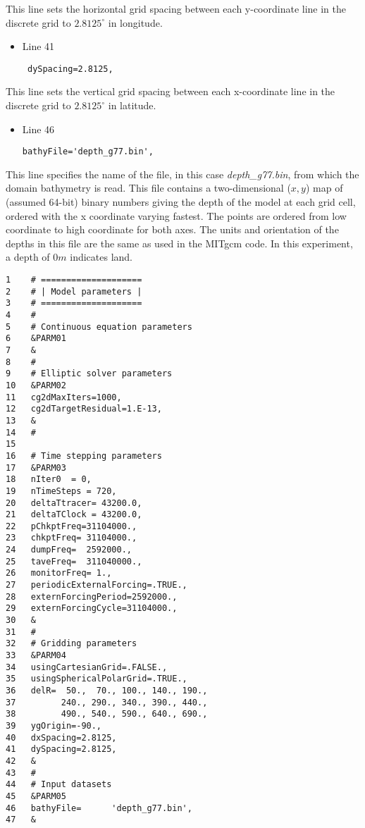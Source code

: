 \noindent This line sets the horizontal grid spacing between each
y-coordinate line in the discrete grid to $2.8125^{\circ}$ in
longitude.

\begin{itemize}
\item Line 41
\begin {verbatim}
 dySpacing=2.8125,
\end{verbatim}
\end{itemize}

\noindent This line sets the vertical grid spacing between each
x-coordinate line in the discrete grid to $2.8125^{\circ}$ in
latitude.

\begin{itemize}
\item Line 46
\begin {verbatim}
bathyFile='depth_g77.bin',
\end{verbatim}
\end{itemize}

\noindent This line specifies the name of the file, in this case {\it
  depth\_g77.bin}, from which the domain bathymetry is read. This file
contains a two-dimensional ($x,y$) map of (assumed 64-bit) binary
numbers giving the depth of the model at each grid cell, ordered with
the x coordinate varying fastest. The points are ordered from low
coordinate to high coordinate for both axes. The units and orientation
of the depths in this file are the same as used in the MITgcm code. In
this experiment, a depth of $0m$ indicates land.
  

\begin {verbatim}
1    # ====================
2    # | Model parameters |
3    # ====================
4    #
5    # Continuous equation parameters
6    &PARM01
7    &
8    #
9    # Elliptic solver parameters
10   &PARM02
11   cg2dMaxIters=1000,
12   cg2dTargetResidual=1.E-13,
13   &
14   #
15
16   # Time stepping parameters
17   &PARM03
18   nIter0  = 0,
19   nTimeSteps = 720,
20   deltaTtracer= 43200.0,
21   deltaTClock = 43200.0,
22   pChkptFreq=31104000.,
23   chkptFreq= 31104000.,
24   dumpFreq=  2592000.,
25   taveFreq=  311040000.,
26   monitorFreq= 1.,
27   periodicExternalForcing=.TRUE.,
28   externForcingPeriod=2592000.,
29   externForcingCycle=31104000.,
30   &
31   #
32   # Gridding parameters
33   &PARM04
34   usingCartesianGrid=.FALSE.,
35   usingSphericalPolarGrid=.TRUE.,
36   delR=  50.,  70., 100., 140., 190., 
37         240., 290., 340., 390., 440., 
38         490., 540., 590., 640., 690.,
39   ygOrigin=-90.,
40   dxSpacing=2.8125,
41   dySpacing=2.8125,
42   &
43   #
44   # Input datasets
45   &PARM05
46   bathyFile=      'depth_g77.bin',
47   &
\end{verbatim}

